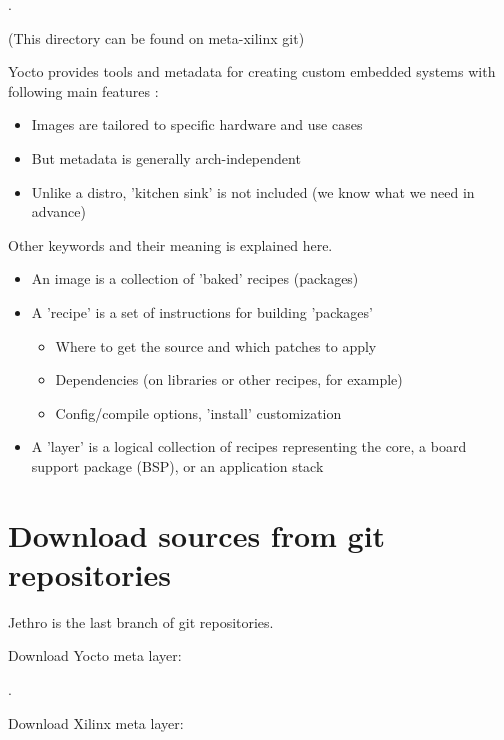 .

\vspace{1em}

\texttt{} (This directory can be found on meta-xilinx git)


Yocto provides tools and metadata for creating custom embedded systems with following main features :
\begin{itemize}
\item Images are tailored to specific hardware and use cases
\item But metadata is generally arch-independent
\item Unlike a distro, 'kitchen sink' is not included (we know what we need in advance)
\end{itemize}

Other keywords and their meaning is explained here.
\begin{itemize}
\item An image is a collection of 'baked' recipes (packages)
\item A 'recipe' is a set of instructions for building 'packages'
\begin{itemize}[label=$\star$]
\item Where to get the source and which patches to apply
\item Dependencies (on libraries or other recipes, for example)
\item Config/compile options, 'install' customization
\end{itemize}
\item A 'layer' is a logical collection of recipes representing the core, a board support package (BSP), or an application stack
\end{itemize}

\section{Download sources from git repositories}

Jethro is the last branch of git repositories.

Download Yocto meta layer:

.

Download Xilinx meta layer:

